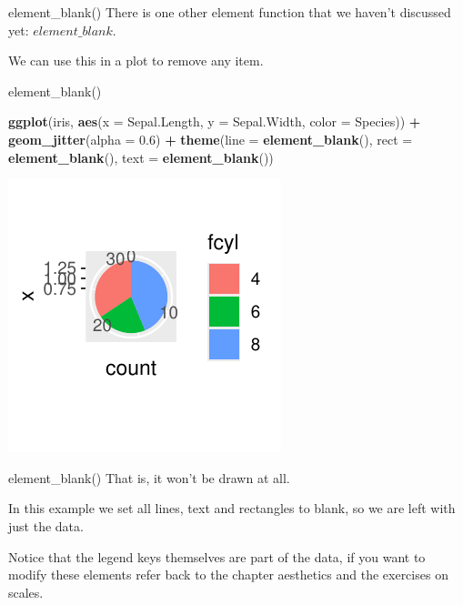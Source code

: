 \documentclass[
  ignorenonframetext,
]{beamer}
\newenvironment{Shaded}{\begin{snugshade}}{\end{snugshade}}
\newcommand{\AttributeTok}[1]{\textcolor[rgb]{0.13,0.29,0.53}{#1}}
\newcommand{\FloatTok}[1]{\textcolor[rgb]{0.00,0.00,0.81}{#1}}
\newcommand{\FunctionTok}[1]{\textcolor[rgb]{0.13,0.29,0.53}{\textbf{#1}}}
\newcommand{\NormalTok}[1]{#1}
\newcommand{\SpecialCharTok}[1]{\textcolor[rgb]{0.81,0.36,0.00}{\textbf{#1}}}
\begin{document}
\begin{frame}{element\_blank()}
\label{element_blank}
There is one other element function that we haven't discussed yet:
\(element\_blank\).

We can use this in a plot to remove any item.
\end{frame}

\begin{frame}[fragile]{element\_blank()}
\label{element_blank-1}

\begin{Shaded}
\begin{Highlighting}[]
\FunctionTok{ggplot}\NormalTok{(iris, }\FunctionTok{aes}\NormalTok{(}\AttributeTok{x =}\NormalTok{ Sepal.Length, }\AttributeTok{y =}\NormalTok{ Sepal.Width, }\AttributeTok{color =}\NormalTok{ Species)) }\SpecialCharTok{+}
    \FunctionTok{geom\_jitter}\NormalTok{(}\AttributeTok{alpha =} \FloatTok{0.6}\NormalTok{) }\SpecialCharTok{+} \FunctionTok{theme}\NormalTok{(}\AttributeTok{line =} \FunctionTok{element\_blank}\NormalTok{(),}
    \AttributeTok{rect =} \FunctionTok{element\_blank}\NormalTok{(), }\AttributeTok{text =} \FunctionTok{element\_blank}\NormalTok{())}
\end{Highlighting}
\end{Shaded}

\begin{center}\includegraphics[width=0.5\linewidth]{Figs/unnamed-chunk-66-1} \end{center}
\end{frame}

\begin{frame}{element\_blank()}
\label{element_blank-2}
That is, it won't be drawn at all.

In this example we set all lines, text and rectangles to blank, so we
are left with just the data.

Notice that the legend keys themselves are part of the data, if you want
to modify these elements refer back to the chapter aesthetics and the
exercises on scales.
\end{frame}
\end{document}
